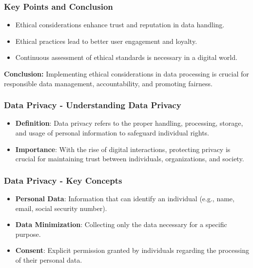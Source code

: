 \documentclass[aspectratio=169]{beamer}
\begin{document}
\begin{frame}[fragile]
    \frametitle{Key Points and Conclusion}
    \begin{itemize}
        \item Ethical considerations enhance trust and reputation in data handling.
        \item Ethical practices lead to better user engagement and loyalty.
        \item Continuous assessment of ethical standards is necessary in a digital world.
    \end{itemize}
    \textbf{Conclusion:} Implementing ethical considerations in data processing is crucial for responsible data management, accountability, and promoting fairness.
\end{frame}

\begin{frame}[fragile]
    \frametitle{Data Privacy - Understanding Data Privacy}
    \begin{itemize}
        \item \textbf{Definition}: Data privacy refers to the proper handling, processing, storage, and usage of personal information to safeguard individual rights.
        \item \textbf{Importance}: With the rise of digital interactions, protecting privacy is crucial for maintaining trust between individuals, organizations, and society.
    \end{itemize}
\end{frame}

\begin{frame}[fragile]
    \frametitle{Data Privacy - Key Concepts}
    \begin{itemize}
        \item \textbf{Personal Data}: Information that can identify an individual (e.g., name, email, social security number).
        \item \textbf{Data Minimization}: Collecting only the data necessary for a specific purpose.
        \item \textbf{Consent}: Explicit permission granted by individuals regarding the processing of their personal data.
    \end{itemize}
\end{frame}
\end{document}
